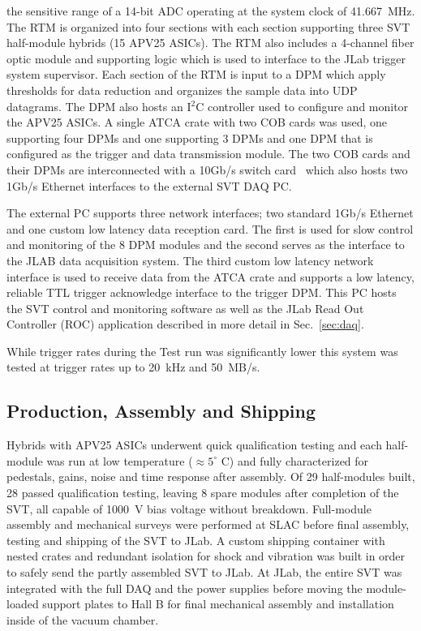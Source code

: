 \documentclass[final,3p,times,twocolumn]{elsarticle}
\begin{document}
the sensitive range of a 14-bit ADC operating at the system clock of 41.667~MHz. The RTM is organized 
into four sections with each section supporting three SVT half-module hybrids (15 APV25 ASICs). The 
RTM also includes a 4-channel fiber optic module and supporting logic which is used to interface 
to the JLab trigger system supervisor. Each section of the RTM is input to a DPM which apply thresholds 
for data reduction and organizes the sample data into UDP datagrams. The DPM also hosts an I$^{2}$C 
controller used to configure and monitor the APV25 ASICs. A single ATCA crate with two COB cards 
was used, one supporting four DPMs and one supporting 3 DPMs and one DPM that is configured as 
the trigger and data transmission module. The two COB cards and their DPMs are interconnected with a 
10Gb/s switch card~\cite{Larsen:2011zb} which also hosts two 1Gb/s Ethernet interfaces to the external 
SVT DAQ PC.  

The external PC supports three network interfaces; two standard 1Gb/s Ethernet and one custom low 
latency data reception card. The first is used for slow control and monitoring of the 8 
DPM modules and the second serves as the interface to the JLAB data acquisition system. The third 
custom low latency network interface is used to receive data from the ATCA crate and supports a low 
latency, reliable TTL trigger acknowledge interface to the trigger DPM. This PC hosts the SVT control 
and monitoring software as well as the JLab Read Out Controller (ROC) application described in more 
detail in Sec.~\ref{sec:daq}.

While trigger rates during the Test run was significantly lower this system was tested at trigger rates up 
to 20~kHz and 50~MB/s.


\subsection{Production, Assembly and Shipping}

Hybrids with APV25 ASICs underwent quick qualification testing and each half-module was run at low 
temperature ($\approx5^{\circ}$ C) and fully characterized for pedestals, gains, noise and time response 
after assembly.  Of 29 half-modules built, 28 passed qualification testing, leaving 8 spare modules after 
completion of the SVT, all capable of 1000~V bias voltage without breakdown.  Full-module assembly 
and mechanical surveys were performed at SLAC before final assembly, testing and shipping of the 
SVT to JLab. A custom shipping container with nested crates and redundant isolation for shock and 
vibration was built in order to safely send the partly assembled SVT to JLab. At JLab, the entire SVT was 
integrated with the full DAQ and the power supplies before moving the module-loaded support plates to 
Hall B for final mechanical assembly and installation inside of the vacuum chamber.
\end{document}
